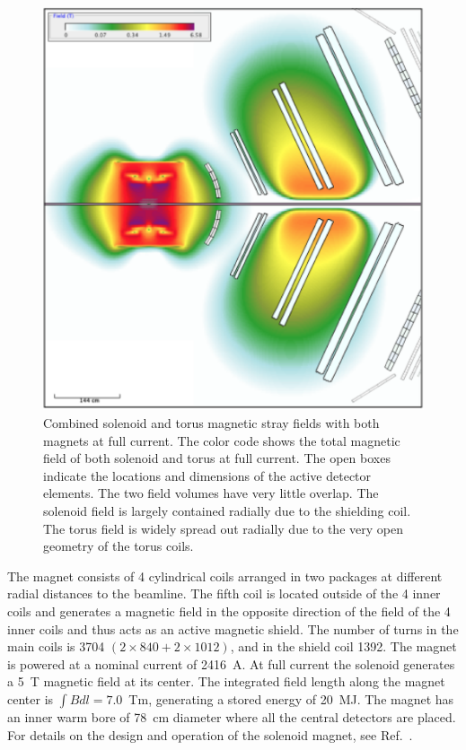\documentclass[final,3p,twocolumn]{elsarticle}
\begin{document}
\begin{figure}[htbp!]
\centerline{\includegraphics[width=0.8\columnwidth]{magfield-2.png}}
\caption{Combined solenoid and torus magnetic stray fields with both magnets at full current. The color code shows
  the total magnetic field of both solenoid and torus at full current. The open boxes indicate the locations and
  dimensions of the active detector elements. The two field volumes have very little overlap. The solenoid field is
  largely contained radially due to the shielding coil. The torus field is widely spread out radially due to the very
  open geometry of the torus coils.}
\label{stray-field}
\end{figure}

The magnet consists of 4 cylindrical coils arranged in two packages at different radial distances to the beamline.
The fifth coil is located outside of the 4 inner coils and generates a magnetic field in the opposite direction of the
field of the 4 inner coils and thus acts as an active magnetic shield. The number of turns in the main coils is 3704
$(2 \times 840 + 2 \times 1012)$, and in the shield coil 1392. The magnet is powered at a nominal current of
2416~A. At full current the solenoid generates a 5~T magnetic field at its center. The integrated field length along
the magnet center is $\int Bdl = 7.0$~Tm, generating a stored energy of 20~MJ. The magnet has an inner warm bore
of 78~cm diameter where all the central detectors are placed.  For details on the design and operation of the
solenoid magnet, see Ref.~\cite{clas12-magnets}.
\end{document}
